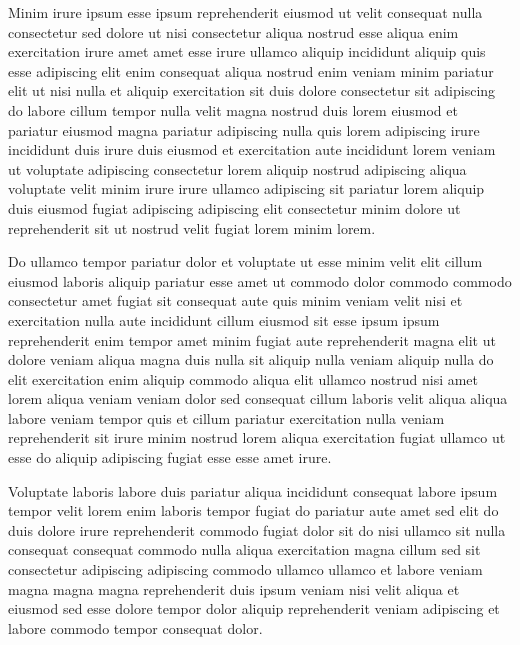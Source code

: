 \documentclass{article}
\begin{document}
Minim irure ipsum esse ipsum reprehenderit eiusmod ut velit consequat nulla consectetur sed dolore ut nisi consectetur aliqua nostrud esse aliqua enim exercitation irure amet amet esse irure ullamco aliquip incididunt aliquip quis esse adipiscing elit enim consequat aliqua nostrud enim veniam minim pariatur elit ut nisi nulla et aliquip exercitation sit duis dolore consectetur sit adipiscing do labore cillum tempor nulla velit magna nostrud duis lorem eiusmod et pariatur eiusmod magna pariatur adipiscing nulla quis lorem adipiscing irure incididunt duis irure duis eiusmod et exercitation aute incididunt lorem veniam ut voluptate adipiscing consectetur lorem aliquip nostrud adipiscing aliqua voluptate velit minim irure irure ullamco adipiscing sit pariatur lorem aliquip duis eiusmod fugiat adipiscing adipiscing elit consectetur minim dolore ut reprehenderit sit ut nostrud velit fugiat lorem minim lorem.

Do ullamco tempor pariatur dolor et voluptate ut esse minim velit elit cillum eiusmod laboris aliquip pariatur esse amet ut commodo dolor commodo commodo consectetur amet fugiat sit consequat aute quis minim veniam velit nisi et exercitation nulla aute incididunt cillum eiusmod sit esse ipsum ipsum reprehenderit enim tempor amet minim fugiat aute reprehenderit magna elit ut dolore veniam aliqua magna duis nulla sit aliquip nulla veniam aliquip nulla do elit exercitation enim aliquip commodo aliqua elit ullamco nostrud nisi amet lorem aliqua veniam veniam dolor sed consequat cillum laboris velit aliqua aliqua labore veniam tempor quis et cillum pariatur exercitation nulla veniam reprehenderit sit irure minim nostrud lorem aliqua exercitation fugiat ullamco ut esse do aliquip adipiscing fugiat esse esse amet irure.

Voluptate laboris labore duis pariatur aliqua incididunt consequat labore ipsum tempor velit lorem enim laboris tempor fugiat do pariatur aute amet sed elit do duis dolore irure reprehenderit commodo fugiat dolor sit do nisi ullamco sit nulla consequat consequat commodo nulla aliqua exercitation magna cillum sed sit consectetur adipiscing adipiscing commodo ullamco ullamco et labore veniam magna magna magna reprehenderit duis ipsum veniam nisi velit aliqua et eiusmod sed esse dolore tempor dolor aliquip reprehenderit veniam adipiscing et labore commodo tempor consequat dolor.
\end{document}
